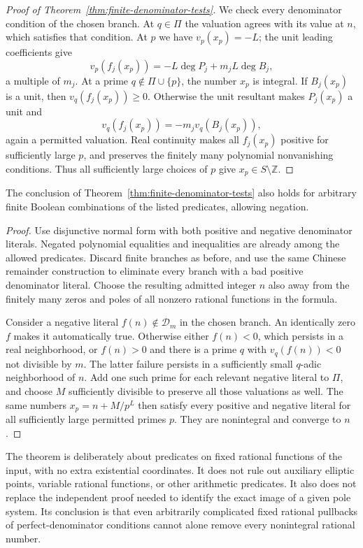 \begin{proof}[Proof of Theorem~\ref{thm:finite-denominator-tests}]
We check every denominator condition of the chosen branch.  At
$q\in\Pi$ the valuation agrees with its value at $n$, which
satisfies that condition.  At $p$ we have $v_p(x_p)=-L$; the unit
leading coefficients give
\[
 v_p(f_j(x_p))=-L\deg P_j+m_jL\deg B_j,
\]
a multiple of $m_j$.  At a prime $q\notin\Pi\cup\{p\}$,
the number $x_p$ is integral.  If $B_j(x_p)$ is a unit, then
$v_q(f_j(x_p))\ge0$.  Otherwise the unit resultant makes
$P_j(x_p)$ a unit and
\[
                      v_q(f_j(x_p))=-m_jv_q(B_j(x_p)),
\]
again a permitted valuation.  Real continuity makes all $f_j(x_p)$
positive for sufficiently large $p$, and preserves the finitely
many polynomial nonvanishing conditions.  Thus all sufficiently
large choices of $p$ give $x_p\in S\setminus\mathbb Z$.
\end{proof}

\begin{corollary}\label{cor:boolean-denominator-tests}
The conclusion of Theorem~\ref{thm:finite-denominator-tests} also
holds for arbitrary finite Boolean combinations of the listed
predicates, allowing negation.
\end{corollary}
\begin{proof}
Use disjunctive normal form with both positive and negative denominator
literals.  Negated polynomial equalities and inequalities are already
among the allowed predicates.  Discard finite branches as before, and
use the same Chinese remainder construction to eliminate every branch
with a bad positive denominator literal.  Choose the resulting
admitted integer $n$ also away from the finitely many zeros and poles
of all nonzero rational functions in the formula.

Consider a negative literal $f(n)\notin\mathcal D_m$ in the chosen
branch.  An identically zero $f$ makes it automatically true.  Otherwise
either $f(n)<0$, which persists in a real neighborhood, or $f(n)>0$
and there is a prime $q$ with $v_q(f(n))<0$ not divisible by $m$.
The latter failure persists in a sufficiently small $q$-adic
neighborhood of $n$.  Add one such prime for each relevant negative
literal to $\Pi$, and choose $M$ sufficiently divisible to preserve
all those valuations as well.  The same numbers $x_p=n+M/p^L$
then satisfy every positive and negative literal for all sufficiently
large permitted primes $p$.  They are nonintegral and converge to $n$.
\end{proof}

The theorem is deliberately about predicates on fixed rational
functions of the input, with no extra existential coordinates.
It does not rule out auxiliary elliptic points, variable rational
functions, or other arithmetic predicates.  It also does not replace
the independent proof needed to identify the exact image of a given
pole system.  Its conclusion is that even arbitrarily complicated
fixed rational pullbacks of perfect-denominator conditions cannot
alone remove every nonintegral rational number.
